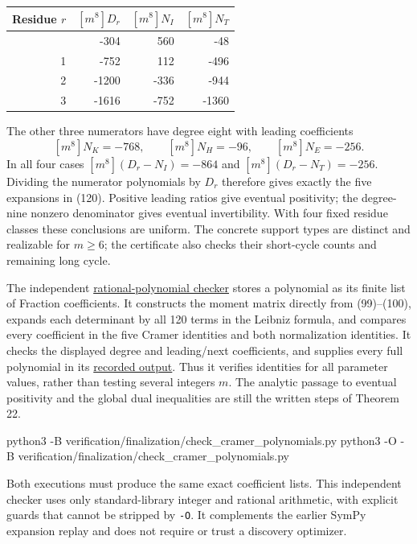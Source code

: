 \documentclass[
  11pt,
]{article}
\newenvironment{Shaded}{}{}
\newcommand{\AttributeTok}[1]{\textcolor[rgb]{0.49,0.56,0.16}{#1}}
\newcommand{\ExtensionTok}[1]{#1}
\newcommand{\NormalTok}[1]{#1}
\begin{document}
\begin{longtable}[]{@{}rrrr@{}}
\toprule\noalign{}
Residue \(r\) & \([m^8]D_r\) & \([m^8]N_I\) & \([m^8]N_T\) \\
\midrule\noalign{}
\endhead
\bottomrule\noalign{}
\endlastfoot
0 & -304 & 560 & -48 \\
1 & -752 & 112 & -496 \\
2 & -1200 & -336 & -944 \\
3 & -1616 & -752 & -1360 \\
\end{longtable}

The other three numerators have degree eight with leading coefficients
\[
[m^8]N_K=-768,\qquad [m^8]N_H=-96,\qquad [m^8]N_E=-256.
\] In all four cases \([m^8](D_r-N_I)=-864\) and
\([m^8](D_r-N_T)=-256\). Dividing the numerator polynomials by \(D_r\)
therefore gives exactly the five expansions in (120). Positive leading
ratios give eventual positivity; the degree-nine nonzero denominator
gives eventual invertibility. With four fixed residue classes these
conclusions are uniform. The concrete support types are distinct and
realizable for \(m\ge6\); the certificate also checks their short-cycle
counts and remaining long cycle.

The independent
\href{../../verification/finalization/check_cramer_polynomials.py}{rational-polynomial
checker} stores a polynomial as its finite list of Fraction
coefficients. It constructs the moment matrix directly from (99)--(100),
expands each determinant by all 120 terms in the Leibniz formula, and
compares every coefficient in the five Cramer identities and both
normalization identities. It checks the displayed degree and
leading/next coefficients, and supplies every full polynomial in its
\href{../../verification/finalization/results/cramer-polynomials.json}{recorded
output}. Thus it verifies identities for all parameter values, rather
than testing several integers \(m\). The analytic passage to eventual
positivity and the global dual inequalities are still the written steps
of Theorem 22.

\begin{Shaded}
\begin{Highlighting}[]
\ExtensionTok{python3} \AttributeTok{{-}B}\NormalTok{ verification/finalization/check\_cramer\_polynomials.py}
\ExtensionTok{python3} \AttributeTok{{-}O} \AttributeTok{{-}B}\NormalTok{ verification/finalization/check\_cramer\_polynomials.py}
\end{Highlighting}
\end{Shaded}

Both executions must produce the same exact coefficient lists. This
independent checker uses only standard-library integer and rational
arithmetic, with explicit guards that cannot be stripped by \texttt{-O}.
It complements the earlier SymPy expansion replay and does not require
or trust a discovery optimizer.
\end{document}
